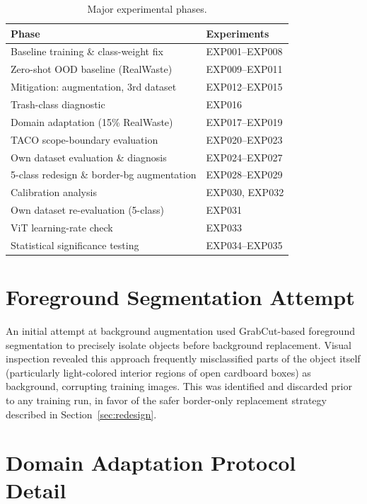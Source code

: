 \documentclass[a4paper]{article}
\begin{document}
\begin{table}[h]
\caption{Major experimental phases.}
\label{tab:explog}
\centering
\small
\begin{tabular}{ll}
\toprule
Phase & Experiments \\
\midrule
Baseline training \& class-weight fix & EXP001--EXP008 \\
Zero-shot OOD baseline (RealWaste) & EXP009--EXP011 \\
Mitigation: augmentation, 3rd dataset & EXP012--EXP015 \\
Trash-class diagnostic & EXP016 \\
Domain adaptation (15\% RealWaste) & EXP017--EXP019 \\
TACO scope-boundary evaluation & EXP020--EXP023 \\
Own dataset evaluation \& diagnosis & EXP024--EXP027 \\
5-class redesign \& border-bg augmentation & EXP028--EXP029 \\
Calibration analysis & EXP030, EXP032 \\
Own dataset re-evaluation (5-class) & EXP031 \\
ViT learning-rate check & EXP033 \\
Statistical significance testing & EXP034--EXP035 \\
\bottomrule
\end{tabular}
\end{table}

\section{Foreground Segmentation Attempt}
\label{app:segmentation}
An initial attempt at background augmentation used GrabCut-based foreground segmentation to precisely isolate objects before background replacement. Visual inspection revealed this approach frequently misclassified parts of the object itself (particularly light-colored interior regions of open cardboard boxes) as background, corrupting training images. This was identified and discarded prior to any training run, in favor of the safer border-only replacement strategy described in Section~\ref{sec:redesign}.

\section{Domain Adaptation Protocol Detail}
\label{app:adaptation}
\end{document}
